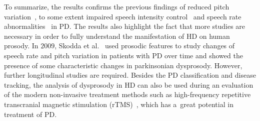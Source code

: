 To summarize, the results confirms the previous findings of reduced pitch variation~\cite{Canter1963, Metter1986, Flint1992, Goberman2005b, Goberman2005d, Rusz2011}, to some extent impaired speech intensity control~\cite{Metter1986, Watson2008, Skodda2011c, Rusz2011, Clark2014} and speech rate abnormalities~\cite{Weismer1984, Metter1986, Skodda2008, Skodda2011c} in PD. The results also highlight the fact that more studies are necessary in order to fully understand the manifestation of HD on human prosody. In $2009$, Skodda et al.~\cite{Skodda2009} used prosodic features to study changes of speech rate and pitch variation in patients with PD over time and showed the presence of some characteristic changes in parkinsonian dysprosody. However, further longitudinal studies are required. Besides the PD classification and disease tracking, the analysis of dysprosody in HD can also be used during an evaluation of the modern non-invasive treatment methods such as high-frequency repetitive transcranial magnetic stimulation (rTMS)~\cite{Eliasova2013}, which has a~great potential in treatment of PD. 